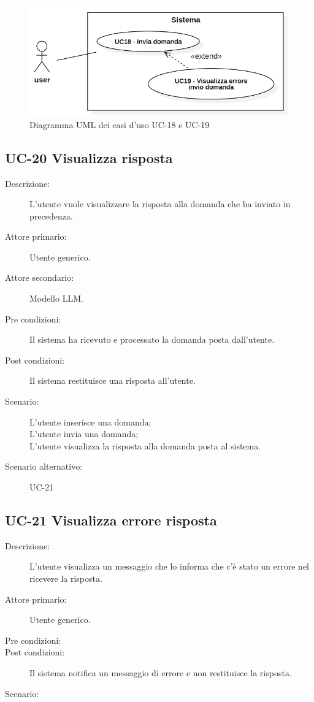 \begin{figure}[H]
    \centering
    \includegraphics[width=\linewidth]{UC18-19.PNG}
    \caption{Diagramma UML dei casi d'uso UC-18 e UC-19}
    \label{fig:UC18-19}
\end{figure}

\subsection{UC-20 Visualizza risposta}
\begin{description}
    \item[Descrizione:] L'utente vuole visualizzare la risposta alla domanda che ha inviato in precedenza.
    \item[Attore primario:] Utente generico.
    \item[Attore secondario:] Modello LLM. 
    \item[Pre condizioni:] Il sistema ha ricevuto e processato la domanda posta dall'utente.
    \item[Post condizioni:] Il sistema restituisce una risposta all'utente.
    \item[Scenario:] L'utente inserisce una domanda;\\L'utente invia una domanda;\\L'utente visualizza la risposta alla domanda posta al sistema.
    \item[Scenario alternativo:] UC-21
\end{description}

\subsection{UC-21 Visualizza errore risposta}
\begin{description}
    \item[Descrizione:] L'utente visualizza un messaggio che lo informa che c'è stato un errore nel ricevere la risposta.
    \item[Attore primario:] Utente generico.
    \item[Pre condizioni:] 
    \item[Post condizioni:] Il sistema notifica un messaggio di errore e non restituisce la risposta.
    \item[Scenario:] 
\end{description}

